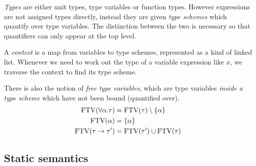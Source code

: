 \emph{Types} are either unit types, type variables or function
types. However expressions are not assigned types directly, instead
they are given \emph{type schemes} which quantify over type
variables. The distinction between the two is necessary so that
quantifiers can only appear at the top level.

A \emph{context} is a map from variables to type schemes, represented
as a kind of linked list. Whenever we need to work out the type of a
variable expression like $x$, we traverse the context to find its type
scheme.

There is also the notion of \emph{free type variables}, which are type
variables \emph{inside a type scheme} which have not been bound
(quantified over).
\begin{align*}
  \operatorname{FTV}(\forall \alpha . \tau) &= \operatorname{FTV}(\tau) \setminus \{\alpha\} \\
  \operatorname{FTV}(\alpha) &= \{ \alpha \} \\
  \operatorname{FTV}(\tau \rightarrow \tau') &= \operatorname{FTV}(\tau') \cup \operatorname{FTV}(\tau)
\end{align*}

\subsection{Static semantics}


